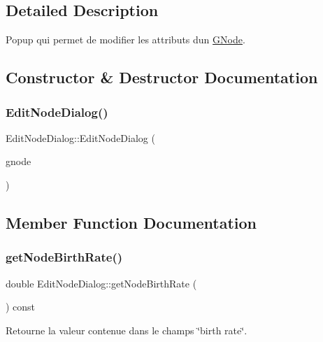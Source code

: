 \subsection{Detailed Description}
Popup qui permet de modifier les attributs d\textquotesingle{}un \mbox{\hyperlink{struct_g_node}{G\+Node}}. 

\subsection{Constructor \& Destructor Documentation}
\mbox{\label{class_edit_node_dialog_ad4521b8c402fe2443755af0b66443de1}} 
\subsubsection{\texorpdfstring{Edit\+Node\+Dialog()}{EditNodeDialog()}}
{\footnotesize\ttfamily Edit\+Node\+Dialog\+::\+Edit\+Node\+Dialog (\begin{DoxyParamCaption}\item[{\mbox{\hyperlink{struct_g_node}{G\+Node}} $\ast$}]{gnode }\end{DoxyParamCaption})}



\subsection{Member Function Documentation}
\mbox{\label{class_edit_node_dialog_ab314148e6b30966638e2be8352098ecd}} 
\subsubsection{\texorpdfstring{get\+Node\+Birth\+Rate()}{getNodeBirthRate()}}
{\footnotesize\ttfamily double Edit\+Node\+Dialog\+::get\+Node\+Birth\+Rate (\begin{DoxyParamCaption}{ }\end{DoxyParamCaption}) const}



Retourne la valeur contenue dans le champs \char`\"{}birth rate\char`\"{}. 

